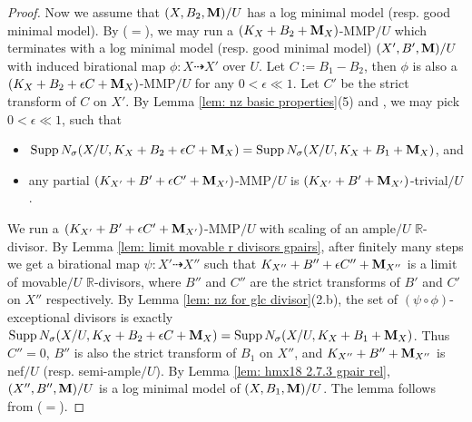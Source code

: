 \documentclass[11pt]{amsart}
\numberwithin{equation}{section}
\newcommand{\Mm}{{\bf{M}}}
\newcommand{\Rr}{\mathbb{R}}
\newcommand{\Supp}{\operatorname{Supp}}
\theoremstyle{definition}
\theoremstyle{definition}
\theoremstyle{definition}
\begin{document}
\begin{proof}
Now we assume that $(X,B_2,\Mm)/U$ has a log minimal model (resp. good minimal model). By \cite[Theorem 2.8]{HL21} ($=$\cite[Version 3, Theorem 2.24]{HL21}), we may run a $(K_X+B_2+\Mm_X)$-MMP$/U$ which terminates with a log minimal model (resp. good minimal model) $(X',B',\Mm)/U$ with induced birational map $\phi: X\dashrightarrow X'$ over $U$. Let $C:=B_1-B_2$, then $\phi$ is also a  $(K_X+B_2+\epsilon C+\Mm_X)$-MMP$/U$ for any $0<\epsilon\ll 1$. Let $C'$ be the strict transform of $C$  on $X'$. By Lemma \ref{lem: nz basic properties}(5) and \cite[Lemma 3.17]{HL18}, we may pick $0<\epsilon\ll 1$, such that
\begin{itemize}
    \item $\Supp N_{\sigma}(X/U,K_X+B_2+\epsilon C+\Mm_X)=\Supp N_{\sigma}(X/U,K_X+B_1+\Mm_X)$, and
    \item any partial $(K_{X'}+B'+\epsilon C'+\Mm_{X'})$-MMP$/U$ is $(K_{X'}+B'+\Mm_{X'})$-trivial$/U$.
\end{itemize}
We run a $(K_{X'}+B'+\epsilon C'+\Mm_{X'})$-MMP$/U$ with scaling of an ample$/U$ $\Rr$-divisor. By Lemma \ref{lem: limit movable r divisors gpairs}, after finitely many steps we get a birational map $\psi: X'\dashrightarrow X''$ such that $K_{X''}+B''+\epsilon C''+\Mm_{X''}$ is a limit of movable$/U$ $\Rr$-divisors, where $B''$ and $C''$ are the strict transforms of $B'$ and $C'$ on $X''$ respectively. By Lemma \ref{lem: nz for glc divisor}(2.b), the set of $(\psi\circ\phi)$-exceptional divisors is exactly $\Supp N_{\sigma}(X/U,K_X+B_2+\epsilon C+\Mm_X)=\Supp N_{\sigma}(X/U,K_X+B_1+\Mm_X)$. Thus $C''=0$, $B''$ is also the strict transform of $B_1$ on $X''$, and $K_{X''}+B''+\Mm_{X''}$ is nef$/U$ (resp. semi-ample$/U$). By Lemma \ref{lem: hmx18 2.7.3 gpair rel}, $(X'',B'',\Mm)/U$ is a log minimal model of $(X,B_1,\Mm)/U$. The lemma follows from \cite[Lemma 3.5(2)]{HL21} ($=$\cite[Version 3, Lemma 3.9(2)]{HL21}).
\end{proof}
\end{document}
